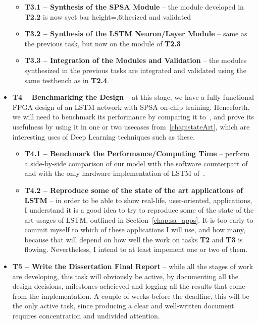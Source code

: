 \begin{itemize}
        \begin{itemize}
            \item \textbf{T3.1 -- Synthesis of the SPSA Module} -- the module developed in \textbf{T2.2} is now syet
                {bar height=.6}thesized and validated
            \item \textbf{T3.2 -- Synthesis of the LSTM Neuron/Layer Module} -- same as the previous task, but now on the module of \textbf{T2.3}
            \item \textbf{T3.3 -- Integration of the Modules and Validation} -- the modules synthesized in the previous tasks are integrated and validated using the same testbench as in \textbf{T2.4}.
        \end{itemize}

    \item \textbf{T4 -- Benchmarking the Design} -- at this stage, we have a fully functional FPGA design of an LSTM network with SPSA on-chip training. Henceforth, we will need to benchmark its performance by comparing it to~\cite{Tavear13, Hochreiter07}, and prove its usefulness by using it in one or two usecases from~\ref{chap:stateArt}, which are interesting uses of Deep Learning techniques such as these.

        \begin{itemize}
            \item \textbf{T4.1 -- Benchmark the Performance/Computing Time} -- perform a side-by-side comparison of our model with the software counterpart of\cite{Tavear13, Hochreiter07} and with the only hardware implementation of LSTM of~\cite{Chang15}.
            \item \textbf{T4.2 -- Reproduce some of the state of the art applications of LSTM} -- in order to be able to show real-life, user-oriented, applications, I understand it is a good idea to try to reproduce some of the state of the art usages of LSTM, outlined in Section~\ref{chap:sa_apps}. It is too early to commit myself to which of these applications I will use, and how many, because that will depend on how well the work on tasks \textbf{T2} and \textbf{T3} is flowing. Nevertheless, I intend to at least impement one or two of them.
        \end{itemize}

    \item \textbf{T5 -- Write the Dissertation Final Report} -- while all the stages of work are developing, this task will obviously be active, by documenting all the design decisions, milestones acheieved and logging all the results that come from the implementation. A couple of weeks before the deadline, this will be the only active task, since producing a clear and well-written document requires concentration and undivided attention.

\end{itemize}

